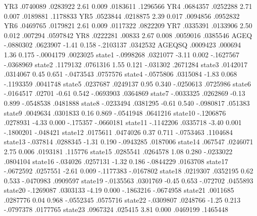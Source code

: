          YR3 {\VBAR}   .0740089   .0283922     2.61   0.009     .0183611    .1296566
         YR4 {\VBAR}   .0684357   .0252288     2.71   0.007     .0189881    .1178833
         YR5 {\VBAR}   .0523844   .0218875     2.39   0.017     .0094856    .0952832
         YR6 {\VBAR}   .0469765   .0179821     2.61   0.009     .0117322    .0822209
         YR7 {\VBAR}   .0335391   .0133906     2.50   0.012      .007294    .0597842
         YR8 {\VBAR}   .0222281     .00833     2.67   0.008     .0059016    .0385546
        AGEQ {\VBAR}  -.0880302   .0623907    -1.41   0.158    -.2103137    .0342532
      AGEQSQ {\VBAR}   .0009423    .000694     1.36   0.175    -.0004179    .0023025
      state1 {\VBAR}  -.0998268   .0321077    -3.11   0.002    -.1627567   -.0368969
      state2 {\VBAR}   .1179132   .0761316     1.55   0.121     -.031302    .2671284
      state3 {\VBAR}   .0142017   .0314067     0.45   0.651    -.0473543    .0757576
      state4 {\VBAR}  -.0575806   .0315084    -1.83   0.068    -.1193359    .0041748
      state5 {\VBAR}   .0237687   .0249137     0.95   0.340    -.0250613    .0725986
      state6 {\VBAR}  -.0164517     .02701    -0.61   0.542    -.0693903    .0364869
      state7 {\VBAR}  -.0033325   .0262869    -0.13   0.899    -.0548538    .0481888
      state8 {\VBAR}  -.0233494   .0381295    -0.61   0.540    -.0980817     .051383
      state9 {\VBAR}   .0049634   .0301833     0.16   0.869    -.0541948    .0641216
     state10 {\VBAR}  -.1206876   .0278931    -4.33   0.000     -.175357   -.0660181
     state11 {\VBAR}  -.1142206   .0335718    -3.40   0.001    -.1800201    -.048421
     state12 {\VBAR}   .0175611   .0474026     0.37   0.711    -.0753463    .1104684
     state13 {\VBAR}   -.037814   .0288345    -1.31   0.190    -.0943285    .0187006
     state14 {\VBAR}    .067547   .0246071     2.75   0.006     .0193181     .115776
     state15 {\VBAR}   .0285541   .0264578     1.08   0.280    -.0233022    .0804104
     state16 {\VBAR}   -.034026   .0257131    -1.32   0.186    -.0844229    .0163708
     state17 {\VBAR}  -.0672592   .0257551    -2.61   0.009    -.1177383   -.0167802
     state18 {\VBAR}   .0219307   .0352195     0.62   0.533    -.0470983    .0909597
     state19 {\VBAR}  -.0135563   .0301769    -0.45   0.653     -.072702    .0455893
     state20 {\VBAR}  -.1269087   .0303133    -4.19   0.000    -.1863216   -.0674958
     state21 {\VBAR}   .0011685   .0287776     0.04   0.968    -.0552345    .0575716
     state22 {\VBAR}  -.0309807   .0248766    -1.25   0.213    -.0797378    .0177765
     state23 {\VBAR}   .0967324    .025415     3.81   0.000     .0469199    .1465448
